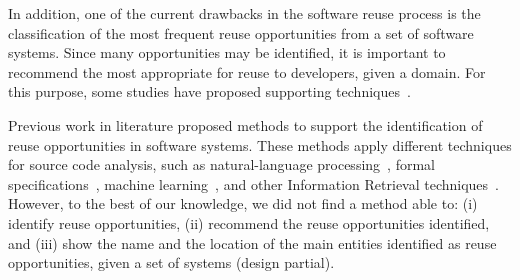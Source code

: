 In addition, one of the current drawbacks in the software reuse process is the classification of the most frequent reuse opportunities from a set of software systems. Since many opportunities may be identified, it is important to recommend the most appropriate for reuse to developers, given a domain. For this purpose, some studies have proposed supporting techniques~\citep{caldiera1991identifying,Ye:2005}.

Previous work in literature proposed methods to support the identification of reuse opportunities in software systems. These methods apply different techniques for source code analysis, such as natural-language processing~\citep{maarek1991information}, formal specifications~\citep{caldiera1991identifying}, machine learning~\citep{Kawaguchi2004}, and other Information Retrieval techniques~\citep{Kuhn:2007,Ye:2005}. However, to the best of our knowledge, we did not find a method able to: (i) identify reuse opportunities, (ii) recommend the reuse opportunities identified, and (iii) show the name and the location of the main entities identified as reuse opportunities, given a set of systems (design partial). %






